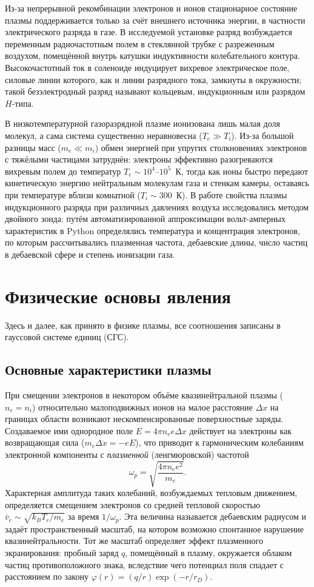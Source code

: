 \documentclass[reprint, amsmath, amssymb, aps, pra, nofootinbib]{revtex4-2}
\begin{document}
Из-за непрерывной рекомбинации электронов и ионов стационарное состояние плазмы поддерживается только за счёт внешнего источника энергии, в частности электрического разряда в газе. В исследуемой установке разряд возбуждается переменным радиочастотным полем в стеклянной трубке с разреженным воздухом, помещённой внутрь катушки индуктивности колебательного контура. Высокочастотный ток в соленоиде индуцирует вихревое электрическое поле, силовые линии которого, как и линии разрядного тока, замкнуты в окружности; такой безэлектродный разряд называют кольцевым, индукционным или разрядом $H$-типа.

В низкотемпературной газоразрядной плазме ионизована лишь малая доля молекул, а сама система существенно неравновесна ($T_e \gg T_i$). Из-за большой разницы масс ($m_e \ll m_i$) обмен энергией при упругих столкновениях электронов с тяжёлыми частицами затруднён: электроны эффективно разогреваются вихревым полем до температур $T_e \sim 10^4$--$10^5$~К, тогда как ионы быстро передают кинетическую энергию нейтральным молекулам газа и стенкам камеры, оставаясь при температуре вблизи комнатной ($T_i \sim 300$~К). В работе свойства плазмы индукционного разряда при различных давлениях воздуха исследовались методом двойного зонда: путём автоматизированной аппроксимации вольт-амперных характеристик в Python определялись температура и концентрация электронов, по которым рассчитывались плазменная частота, дебаевские длины, число частиц в дебаевской сфере и степень ионизации газа.

\section{Физические основы явления}
Здесь и далее, как принято в физике плазмы, все соотношения записаны в гауссовой системе единиц (СГС).

\subsection{Основные характеристики плазмы}
При смещении электронов в некотором объёме квазинейтральной плазмы ($n_e = n_i$) относительно малоподвижных ионов на малое расстояние $\Delta x$ на границах области возникают нескомпенсированные поверхностные заряды. Создаваемое ими однородное поле $E = 4\pi n_e e \Delta x$ действует на электроны как возвращающая сила ($m_e \Delta\ddot{x} = -eE$), что приводит к гармоническим колебаниям электронной компоненты с \textit{плазменной} (ленгмюровской) частотой
\begin{equation}
\omega_p = \sqrt{\frac{4\pi n_e e^2}{m_e}}. \label{eq:omega_p}
\end{equation}
Характерная амплитуда таких колебаний, возбуждаемых тепловым движением, определяется смещением электронов со средней тепловой скоростью $\bar v_e \sim \sqrt{k_B T_e/m_e}$ за время $1/\omega_p$. Эта величина называется дебаевским радиусом и задаёт пространственный масштаб, на котором возможно спонтанное нарушение квазинейтральности. Тот же масштаб определяет эффект плазменного экранирования: пробный заряд $q$, помещённый в плазму, окружается облаком частиц противоположного знака, вследствие чего потенциал поля спадает с расстоянием по закону $\varphi(r) = (q/r)\exp(-r/r_D)$.
\end{document}

